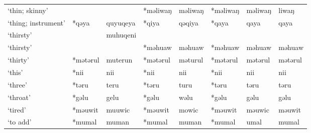 \begin{landscape}
\begin{longtable}[c]{@{}p{3cm}<{\raggedright}p{2.75cm}<{\raggedright}p{2.75cm}<{\raggedright}p{2.75cm}<{\raggedright}p{2.75cm}<{\raggedright}p{2.75cm}<{\raggedright}p{2.75cm}<{\raggedright}p{2.75cm}<{\raggedright}@{}}
`thin; skinny'                                       &                    &                                & *məliwaŋ           & məliwaŋ                    & *məliwaŋ         & məliwaŋ                  & liwaŋ                             \\
`thing; instrument'                                  & *qəya              & quyuqeya                       & *qiya              & qəqiya                     & *qaya            & qaya                     & qaya                              \\
`thirsty'                                            &                    & muhuqeni                       &                    &                            &                  &                          &                                   \\
`thirsty'                                            &                    &                                & *məhuaw            & məhuaw                     & *məhuaw          & məhuaw                   & məhuaw                            \\
`thirty'                                             & *mətərul           & muterun                        & *mətərul           & məturul                    & *mətərul         & mətərul                  & mətərul                           \\
`this'                                               & *nii               & nii                            & *nii               & nii                        & *nii             & nii                      & nii                               \\
`three'                                              & *təru              & teru                           & *təru              & turu                       & *təru            & təru                     & təru                              \\
`throat'                                             & *gəlu              & gelu                           & *gəlu              & wəlu                       & *gəlu            & gəlu                     & gəlu                              \\
`tired'                                              & *məuwit            & muuwic                         & *məuwit            & mowic                      & *məuwit          & məuwic                   & məuwit                            \\
`to add'                                             & *mumal             & muman                          & *mumal             & muman                      & *mumal           & umal                     & mumal                             \\

\end{longtable}
\end{landscape}
